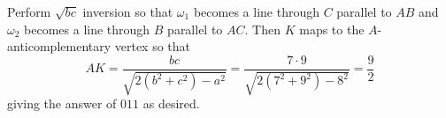 Perform $\sqrt{bc}$ inversion so that $\omega_1$ becomes a line through $C$ parallel to $AB$ and $\omega_2$ becomes a line through $B$ parallel to $AC$. Then $K$ maps to the $A$-anticomplementary vertex so that \[AK=\frac{bc}{\sqrt{2\left(b^2+c^2\right)-a^2}}=\frac{7\cdot9}{\sqrt{2\left(7^2+9^2\right)-8^2}}=\frac{9}{2}\] giving the answer of $\boxed{011}$ as desired.